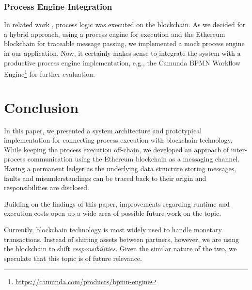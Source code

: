\documentclass[runningheads]{llncs}
\begin{document}
\subsubsection{Process Engine Integration}

In related work \cite{lopez2017caterpillar}, process logic was executed on the blockchain.
As we decided for a hybrid approach, using a process engine for execution and the Ethereum blockchain for traceable message passing, we implemented a mock process engine in our application.
Now, it certainly makes sense to integrate the system with a productive process engine implementation, e.g., the Camunda BPMN Workflow Engine\footnote{\url{https://camunda.com/products/bpmn-engine}} for further evaluation.

\section{Conclusion}

In this paper, we presented a system architecture and prototypical implementation for connecting process execution with blockchain technology.
While keeping the process execution off-chain, we developed an approach of inter-process communication using the Ethereum blockchain as a messaging channel.
Having a permanent ledger as the underlying data structure storing messages, faults and misunderstandings can be traced back to their origin and responsibilities are disclosed.

Building on the findings of this paper, improvements regarding runtime and execution costs open up a wide area of possible future work on the topic.

Currently, blockchain technology is most widely used to handle monetary transactions.
Instead of shifting assets between partners, however, we are using the blockchain to shift \textit{responsibilities}.
Given the similar nature of the two, we speculate that this topic is of future relevance.
%
%
%


\end{document}
